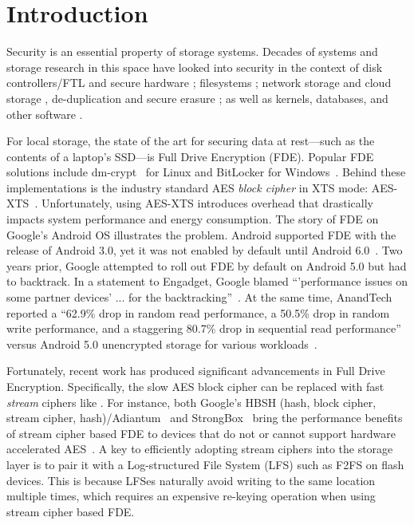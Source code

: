\section{Introduction}\label{sec:introduction}


Security is an essential property of storage systems. Decades of systems and
storage research in this space have looked into security in the context of disk
controllers/FTL and secure hardware \cite{hardware1, hardware2, hardware3,
hardware4}; filesystems \cite{filesystems1, filesystems2, filesystems3,
filesystems4, filesystems5, filesystems6, filesystems7}; network storage and
cloud storage \cite{network1, network2, network3, network4, network5, network6,
network7, network8, network9, network10, network11, network12, network13,
network14, network15, network16}, de-duplication and secure erasure
\cite{erase1, erase2, erase3}; as well as kernels, databases, and other software
\cite{software1, software2, software3, software4}.

For local storage, the state of the art for securing data at rest---such as the
contents of a laptop's SSD---is Full Drive Encryption (FDE). Popular FDE
solutions include dm-crypt~\cite{dmcrypt, DmC-Android} for Linux and BitLocker
for Windows~\cite{bitlocker1, bitlocker2}. Behind these implementations is the
industry standard AES {\em block cipher} in XTS mode: AES-XTS~\cite{XTS,
XTSComments, NISTXTS}. Unfortunately, using AES-XTS introduces overhead that
drastically impacts system performance and energy consumption. The story of FDE
on Google's Android OS illustrates the problem. Android supported FDE with the
release of Android 3.0, yet it was not enabled by default until Android
6.0~\cite{android-M-mobile-motivation}. Two years prior, Google attempted to
roll out FDE by default on Android 5.0 but had to backtrack. In a statement to
Engadget, Google blamed ``'performance issues on some partner devices' ... for
the backtracking''~\cite{google-engadget}. At the same time, AnandTech reported
a ``62.9\% drop in random read performance, a 50.5\% drop in random write
performance, and a staggering 80.7\% drop in sequential read performance''
versus Android 5.0 unencrypted storage for various
workloads~\cite{android-M-mobile-motivation-2}.

Fortunately, recent work has produced significant advancements in Full Drive
Encryption. Specifically, the slow AES block cipher can be replaced with fast
{\em stream} ciphers like \encB. For instance, both Google's HBSH (hash, block
cipher, stream cipher, hash)/Adiantum~\cite{Adiantum} and
StrongBox~\cite{StrongBox} bring the performance benefits of stream cipher based
FDE to devices that do not or cannot support hardware accelerated
AES~\cite{StrongBox}. A key to efficiently adopting stream ciphers into the
storage layer is to pair it with a Log-structured File System (LFS) such as
F2FS\cite{F2FS} on flash devices. This is because LFSes naturally avoid writing
to the same location multiple times, which requires an expensive re-keying
operation when using stream cipher based FDE.

